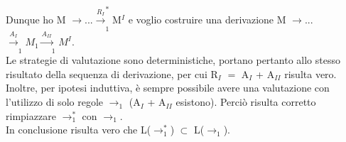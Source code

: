 \begin{enumerate}
\begin{itemize}
\begin{enumerate}
\end{enumerate}
\noindent
Dunque ho M $\rightarrow$...$\xrightarrow[]{R_I}_1^\ast$M$^I$ e voglio costruire una derivazione M $\rightarrow$...$\xrightarrow[]{A_I}_1M_1\xrightarrow[]{A_{II}}_1M^I$.\\
Le strategie di valutazione sono deterministiche, portano pertanto allo stesso risultato della sequenza di derivazione, per cui R$_I$ $=$ A$_I$ + A$_{II}$ risulta vero. Inoltre, per ipotesi induttiva, \`e sempre possibile avere una valutazione con l'utilizzo di solo regole $\rightarrow_1$ (A$_I$ + A$_{II}$ esistono). Perci\`o risulta corretto rimpiazzare $\rightarrow_1^\ast$ con $\rightarrow_1$.\\ In conclusione risulta vero che L($\rightarrow_1^\ast$) $\subset$ L($\rightarrow_1$).
\end{itemize}
\end{enumerate}






